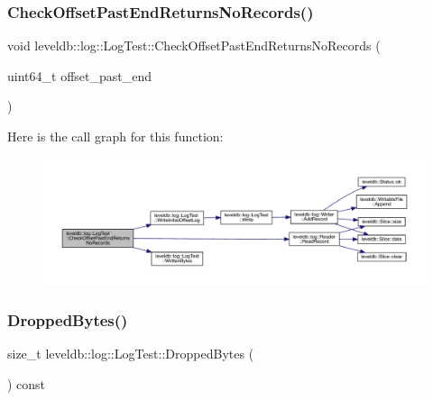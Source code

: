 \subsubsection{\texorpdfstring{CheckOffsetPastEndReturnsNoRecords()}{CheckOffsetPastEndReturnsNoRecords()}}
{\footnotesize\ttfamily void leveldb\+::log\+::\+Log\+Test\+::\+Check\+Offset\+Past\+End\+Returns\+No\+Records (\begin{DoxyParamCaption}\item[{uint64\+\_\+t}]{offset\+\_\+past\+\_\+end }\end{DoxyParamCaption})\hspace{0.3cm}{\ttfamily [inline]}}

Here is the call graph for this function\+:
\nopagebreak
\begin{figure}[H]
\begin{center}
\leavevmode
\includegraphics[width=350pt]{classleveldb_1_1log_1_1_log_test_a2bf9cdf3b3f722c300f65a7752c0e101_cgraph}
\end{center}
\end{figure}
\mbox{\label{classleveldb_1_1log_1_1_log_test_a092d7cb6d95b2f101d89dbee74ee15ad}} 
\subsubsection{\texorpdfstring{DroppedBytes()}{DroppedBytes()}}
{\footnotesize\ttfamily size\+\_\+t leveldb\+::log\+::\+Log\+Test\+::\+Dropped\+Bytes (\begin{DoxyParamCaption}{ }\end{DoxyParamCaption}) const\hspace{0.3cm}{\ttfamily [inline]}}

\mbox{\label{classleveldb_1_1log_1_1_log_test_ac966525faded349590f1a1ae738844cf}} 
